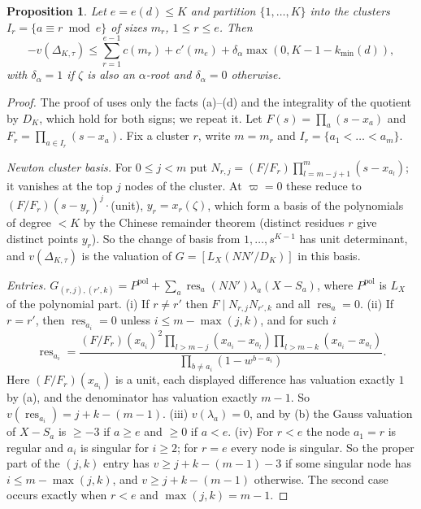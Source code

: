 \documentclass[11pt]{amsart}
\newtheorem{proposition}[theorem]{Proposition}
\theoremstyle{definition}
\theoremstyle{remark}
\numberwithin{equation}{section}
\newcommand{\Res}{\operatorname{res}}
\begin{document}
\begin{proposition}\label{prop:W}
Let $e=e(d)\le K$ and partition $\{1,\dots,K\}$ into the clusters $I_r=\{a\equiv r\bmod e\}$ of sizes $m_r$,
$1\le r\le e$. Then
\[
-v(\Delta_{K,\tau})\le\sum_{r=1}^{e-1}c(m_r)+c'(m_e)+\delta_\alpha\max(0,K-1-k_{\min}(d)),
\]
with $\delta_\alpha=1$ if $\zeta$ is also an $\alpha$-root and $\delta_\alpha=0$ otherwise.
\end{proposition}
\begin{proof}
The proof of \cite[Proposition~4.2]{Kri26} uses only the facts (a)--(d) and the integrality of the quotient by $D_K$,
which hold for both signs; we repeat it. Let $F(s)=\prod_a(s-x_a)$ and $F_r=\prod_{a\in I_r}(s-x_a)$. Fix a cluster
$r$, write $m=m_r$ and $I_r=\{a_1<\dots<a_m\}$.

\emph{Newton cluster basis.} For $0\le j<m$ put $N_{r,j}=(F/F_r)\prod_{l=m-j+1}^m(s-x_{a_l})$; it vanishes at the top
$j$ nodes of the cluster. At $\varpi=0$ these reduce to $(F/F_r)(s-y_r)^j\cdot$(unit), $y_r=x_r(\zeta)$, which form a
basis of the polynomials of degree $<K$ by the Chinese remainder theorem (distinct residues $r$ give distinct points
$y_r$). So the change of basis from $1,\dots,s^{K-1}$ has unit determinant, and $v(\Delta_{K,\tau})$ is the valuation of
$G=[L_X(NN'/D_K)]$ in this basis.

\emph{Entries.} $G_{(r,j),(r',k)}=P^{\mathrm{pol}}+\sum_a\Res_a(NN')\lambda_a(X-S_a)$, where $P^{\mathrm{pol}}$ is $L_X$ of
the polynomial part. (i) If $r\ne r'$ then $F\mid N_{r,j}N_{r',k}$ and all $\Res_a=0$. (ii) If $r=r'$, then
$\Res_{a_i}=0$ unless $i\le m-\max(j,k)$, and for such $i$
\[
\Res_{a_i}=\frac{(F/F_r)(x_{a_i})^2\prod_{l>m-j}(x_{a_i}-x_{a_l})\prod_{l>m-k}(x_{a_i}-x_{a_l})}
{\prod_{b\ne a_i}(1-w^{b-a_i})}.
\]
Here $(F/F_r)(x_{a_i})$ is a unit, each displayed difference has valuation exactly $1$ by (a), and the denominator has
valuation exactly $m-1$. So $v(\Res_{a_i})=j+k-(m-1)$. (iii) $v(\lambda_a)=0$, and by (b) the Gauss valuation of
$X-S_a$ is $\ge-3$ if $a\ge e$ and $\ge0$ if $a<e$. (iv) For $r<e$ the node $a_1=r$ is regular and $a_i$ is singular
for $i\ge2$; for $r=e$ every node is singular. So the proper part of the $(j,k)$ entry has $v\ge j+k-(m-1)-3$ if some
singular node has $i\le m-\max(j,k)$, and $v\ge j+k-(m-1)$ otherwise. The second case occurs exactly when $r<e$ and
$\max(j,k)=m-1$.


\end{proof}
\end{document}
